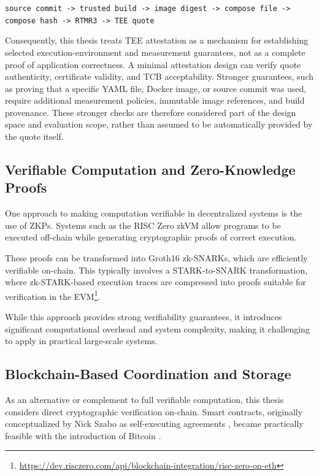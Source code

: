 \begin{center}
\texttt{source commit -> trusted build -> image digest -> compose file -> compose hash -> \ac{RTMR}3 -> TEE quote}
\end{center}

Consequently, this thesis treats TEE attestation as a mechanism for establishing selected execution-environment and measurement guarantees, not as a complete proof of application correctness. A minimal attestation design can verify quote authenticity, certificate validity, and \ac{TCB} acceptability. Stronger guarantees, such as proving that a specific YAML file, Docker image, or source commit was used, require additional measurement policies, immutable image references, and build provenance. These stronger checks are therefore considered part of the design space and evaluation scope, rather than assumed to be automatically provided by the quote itself.



\subsection{Verifiable Computation and Zero-Knowledge Proofs}

One approach to making computation verifiable in decentralized systems is the use of \acp{ZKP}. Systems such as the RISC Zero \ac{zkVM} allow programs to be executed off-chain while generating cryptographic proofs of correct execution.

These proofs can be transformed into Groth16 zk-SNARKs, which are efficiently verifiable on-chain. This typically involves a STARK-to-SNARK transformation, where zk-STARK-based execution traces are compressed into proofs suitable for verification in the \ac{EVM}\footnote{\url{https://dev.risczero.com/api/blockchain-integration/risc-zero-on-eth}}.

While this approach provides strong verifiability guarantees, it introduces significant computational overhead and system complexity, making it challenging to apply in practical large-scale systems.

\subsection{Blockchain-Based Coordination and Storage}

As an alternative or complement to full verifiable computation, this thesis considers direct cryptographic verification on-chain. Smart contracts, originally conceptualized by Nick Szabo as self-executing agreements \cite{szabo1997smart}, became practically feasible with the introduction of Bitcoin \cite{nakamoto2008bitcoin}.


